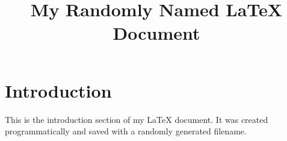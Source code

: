 \documentclass{article}
\title{My Randomly Named LaTeX Document}
\author{}
\date{}
\begin{document}
\maketitle

\section{Introduction}
This is the introduction section of my LaTeX document. It was created programmatically and saved with a randomly generated filename.
\end{document}
